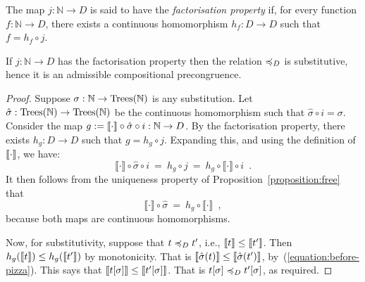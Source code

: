 \begin{definition}
    The map $j\colon \mathbb{N} \to D$ is said to have  the \emph{factorisation property} if,
    for every function $f \colon \mathbb{N} \to D$, there exists a 
    continuous homomorphism $h_{\!f} : D \to D$ such that $f = h_{\!f} \circ j$.
    \begin{center}
    \end{center}
\end{definition}
\begin{proposition}
If $j\colon \mathbb{N} \to D$ has the factorisation property then 
the relation $\preccurlyeq_D$ is substitutive, hence it is an admissible compositional precongruence.
\end{proposition}

\begin{proof}
Suppose $\sigma: \mathbb{N} \to \textnormal{Trees}(\mathbb{N})$ is any  substitution.
Let $\hat{\sigma} : \textnormal{Trees}(\mathbb{N}) \to \textnormal{Trees}(\mathbb{N})$ be the continuous homomorphism
such that $\hat{\sigma} \circ i = \sigma$. Consider the map $g := \llbracket \cdot \rrbracket \circ \hat{\sigma} \circ i : \mathbb{N} \to D$. By the factorisation property, there exists $h_g : D \to D$ such that
$g = h_g \circ j$. Expanding this, and using the definition of $\llbracket \cdot \rrbracket$, we have:
\[
 \llbracket \cdot \rrbracket \circ \hat{\sigma} \circ i ~ = ~ h_g \circ j ~ = ~  h_g \circ  \llbracket \cdot \rrbracket \circ i \enspace .
\]
It then follows from  the uniqueness property of Proposition~\ref{proposition:free} that
\begin{equation}
\label{equation:before-pizza}
\llbracket \cdot \rrbracket \circ \hat{\sigma} ~ = ~ h_g \circ  \llbracket \cdot \rrbracket \enspace ,
\end{equation}
because both maps are continuous homomorphisms.

Now, for substitutivity, suppose  that $t \preccurlyeq_D t'$, i.e., $\llbracket t \rrbracket \leq \llbracket t' \rrbracket$. Then 
$h_g (\llbracket t \rrbracket)  \leq h_g(\llbracket t' \rrbracket)$ by monotonicity. That is
$\llbracket  \hat{\sigma}(t) \rrbracket \leq \llbracket  \hat{\sigma}(t') \rrbracket$, by~(\ref{equation:before-pizza}). 
This says that $\llbracket  t[\sigma] \rrbracket \leq \llbracket t'[\sigma] \rrbracket$. That is
$t[\sigma] \preccurlyeq_D t'[\sigma]$, as required.
\end{proof}


